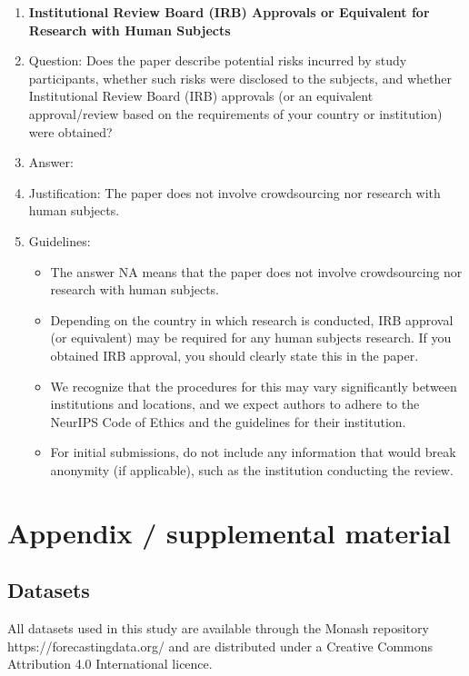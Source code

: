 \documentclass{article}
\begin{document}
\begin{enumerate}
\item {\bf Institutional Review Board (IRB) Approvals or Equivalent for Research with Human Subjects}
    \item[] Question: Does the paper describe potential risks incurred by study participants, whether such risks were disclosed to the subjects, and whether Institutional Review Board (IRB) approvals (or an equivalent approval/review based on the requirements of your country or institution) were obtained?
    \item[] Answer: \answerNA{} %
    \item[] Justification: The paper does not involve crowdsourcing nor research with human subjects.
    \item[] Guidelines: 
    \begin{itemize}
        \item The answer NA means that the paper does not involve crowdsourcing nor research with human subjects.
        \item Depending on the country in which research is conducted, IRB approval (or equivalent) may be required for any human subjects research. If you obtained IRB approval, you should clearly state this in the paper. 
        \item We recognize that the procedures for this may vary significantly between institutions and locations, and we expect authors to adhere to the NeurIPS Code of Ethics and the guidelines for their institution. 
        \item For initial submissions, do not include any information that would break anonymity (if applicable), such as the institution conducting the review.
    \end{itemize}

\end{enumerate}



\FloatBarrier
\newpage
\appendix
\section{Appendix / supplemental material}
\subsection{Datasets}
All datasets used in this study are available through the Monash repository https://forecastingdata.org/ 
and are distributed under a Creative Commons Attribution 4.0 International licence.
\end{document}
